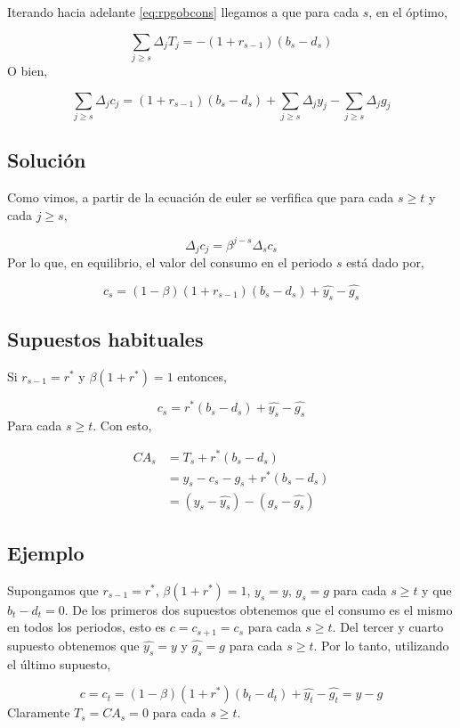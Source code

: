 \documentclass[]{article}
\begin{document}
Iterando hacia adelante \eqref{eq:rpgobcons} llegamos a que para cada
\(s\), en el óptimo,

\[
\sum_{j \geq s} \Delta_j T_j = -(1 + r_{s-1})(b_s-d_s)
\] O bien,

\[
\sum_{j\geq s} \Delta_j c_j = (1 + r_{s-1})(b_s -d_s) + \sum_{j \geq s} \Delta_j y_j - \sum_{j \geq s} \Delta_j g_j
\]

\subsection{Solución}\label{solucion-1}

Como vimos, a partir de la ecuación de euler se verfifica que para cada
\(s \geq t\) y cada \(j \geq s\),

\[
\Delta_j c_j = \beta^{j-s} \Delta_s c_s
\] Por lo que, en equilibrio, el valor del consumo en el periodo \(s\)
está dado por,

\[
c_s = (1-\beta)(1 + r_{s-1})(b_s-d_s) + \hat{y_s} - \hat{g_s}
\]

\subsection{Supuestos habituales}\label{supuestos-habituales-1}

Si \(r_{s-1} = r^*\) y \(\beta(1+r^*) = 1\) entonces,

\[
c_s = r^*(b_s-d_s) + \hat{y_s} - \hat{g_s}
\] Para cada \(s \geq t\). Con esto,

\[
\begin{align}
CA_s &= T_s + r^*(b_s-d_s) \\
&= y_s - c_s - g_s + r^*(b_s-d_s)\\
&= (y_s - \hat{y_s}) - (g_s - \hat{g_s})
\end{align}
\]

\subsection{Ejemplo}\label{ejemplo-1}

Supongamos que \(r_{s-1} = r^*\), \(\beta(1+r^*)=1\), \(y_s = y\),
\(g_s = g\) para cada \(s \geq t\) y que \(b_t - d_t = 0\). De los
primeros dos supuestos obtenemos que el consumo es el mismo en todos los
periodos, esto es \(c = c_{s+1} = c_s\) para cada \(s \geq t\). Del
tercer y cuarto supuesto obtenemos que \(\hat{y_s} = y\) y
\(\hat{g_s} = g\) para cada \(s \geq t\). Por lo tanto, utilizando el
último supuesto,

\[
c = c_t = (1-\beta)(1+r^*)(b_t-d_t) + \hat{y_t} - \hat{g_t} = y-g
\] Claramente \(T_s = CA_s = 0\) para cada \(s \geq t\).
\end{document}
